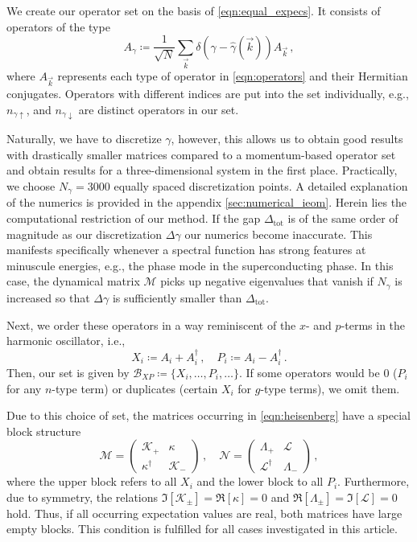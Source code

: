 \documentclass[
    reprint, 
    aps,
    preprintnumbers,
    twocolumn,
    prb,
    superscriptaddress
]{revtex4-2}
\newcommand{\vk}{\vec{k}}
\newcommand{\up}{\uparrow}
\newcommand{\down}{\downarrow}
\newcommand{\mM}{\mathcal{M}}
\newcommand{\mN}{\mathcal{N}}
\begin{document}
We create our operator set on the basis of \eqref{eqn:equal_expecs}.
It consists of operators of the type
\begin{equation}
    \label{eqn:ieom_basis_operator}
    A_\gamma \coloneqq \frac{1}{\sqrt{N}} \sum_{\vk} \delta (\gamma - \hat{\gamma}( \vk )) A_{\vk}\,,
\end{equation}
where $A_{\vk}$ represents each type of operator in \eqref{eqn:operators} and their Hermitian conjugates.
Operators with different indices are put into the set individually, e.g., $n_{\gamma \up}$, and $n_{\gamma \down}$ are distinct operators in our set.

Naturally, we have to discretize $\gamma$, 
however, this allows us to obtain good results with drastically smaller matrices compared to a momentum-based operator set and obtain results for a three-dimensional system in the first place.
Practically, we choose $N_\gamma = 3000$ equally spaced discretization points.
A detailed explanation of the numerics is provided in the appendix \autoref{sec:numerical_ieom}.
Herein lies the computational restriction of our method.
If the gap $\Delta_\text{tot}$ is of the same order of magnitude as our discretization $\Delta \gamma$ our numerics become inaccurate.
This manifests specifically whenever a spectral function has strong features at minuscule energies, e.g., the phase mode in the superconducting phase.
In this case, the dynamical matrix $\mM$ picks up negative eigenvalues that vanish if $N_\gamma$ is increased so that $\Delta \gamma$ is sufficiently smaller than $\Delta_\text{tot}$.

Next, we order these operators in a way reminiscent of the $x$- and $p$-terms in the harmonic oscillator, i.e.,
\begin{equation}
    X_i \coloneqq  A_i + A_i^\dagger\,,\quad P_i \coloneqq  A_i - A_i^\dagger\,.
\end{equation}
Then, our set is given by $\mathcal{B}_{XP} \coloneqq \{ X_i, \ldots, P_i, \ldots \}$.
If some operators would be 0 ($P_i$ for any $n$-type term) or duplicates (certain $X_i$ for $g$-type terms), we omit them.

Due to this choice of set, the matrices occurring in \eqref{eqn:heisenberg} have a special block structure
\begin{equation}
    \label{eqn:xp_set}
    \mM = \begin{pmatrix}
        \mathcal{K}_+ & \kappa \\ \kappa^\dagger & \mathcal{K}_-
    \end{pmatrix}\,,\quad \mN = \begin{pmatrix}
        \Lambda_+ & \mathcal{L} \\ \mathcal{L}^\dagger & \Lambda_-
    \end{pmatrix}\,,
\end{equation}
where the upper block refers to all $X_i$ and the lower block to all $P_i$.
Furthermore, due to symmetry, the relations $\Im [\mathcal{K}_\pm] = \Re [\kappa] = 0$ and $\Re [\Lambda_\pm] = \Im [\mathcal{L}] = 0$ hold.
Thus, if all occurring expectation values are real, both matrices have large empty blocks.
This condition is fulfilled for all cases investigated in this article.
\end{document}

